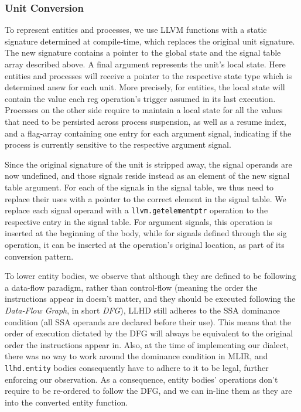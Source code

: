 
\subsubsection{Unit Conversion}
To represent entities and processes, we use LLVM functions with a static signature determined at compile-time, which replaces the original unit signature. The new signature contains a pointer to the global state and the signal table array described above. A final argument represents the unit's local state. Here entities and processes will receive a pointer to the respective state type which is determined anew for each unit. More precisely, for entities, the local state will contain the value each reg operation's trigger assumed in its last execution. Processes on the other side require to maintain a local state for all the values that need to be persisted across process suspension, as well as a resume index, and a flag-array containing one entry for each argument signal, indicating if the process is currently sensitive to the respective argument  signal.

Since the original signature of the unit is stripped away, the signal operands are now undefined, and those signals reside instead as an element of the new signal table argument. For each of the signals in the signal table, we thus need to replace their uses with a pointer to the correct element in the signal table. We replace each signal operand with a \texttt{llvm.getelementptr} operation to the respective entry in the signal table. For argument signals, this operation is inserted at the beginning of the body, while for signals defined through the sig operation, it can be inserted at the operation's original location, as part of its conversion pattern.


To lower entity bodies, we observe that although they are defined to be following a data-flow paradigm, rather than control-flow (meaning the order the instructions appear in doesn't matter, and they should be executed following the \textit{Data-Flow Graph}, in short \textit{DFG}), LLHD still adheres to the SSA dominance condition (all SSA operands are declared before their use). This means that the order of execution dictated by the DFG will always be equivalent to the original order the instructions appear in. Also, at the time of implementing our dialect, there was no way to work around the dominance condition in MLIR, and \texttt{llhd.entity} bodies consequently have to adhere to it to be legal, further enforcing our observation. As a consequence, entity bodies' operations don't require to be re-ordered to follow the DFG, and we can in-line them as they are into the converted entity function.

